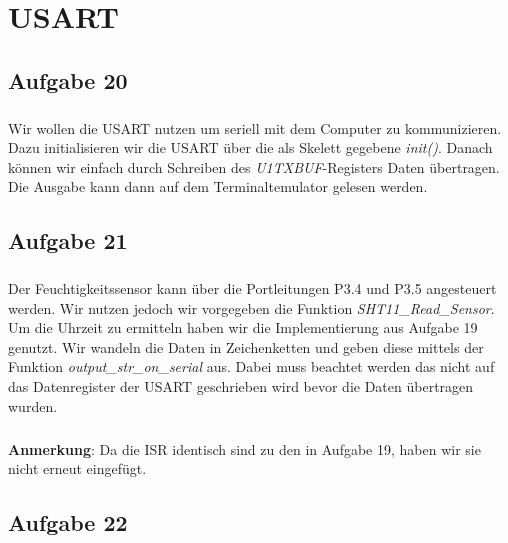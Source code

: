 \chapter{USART}

\section*{Aufgabe 20}

\paragraph*{}
Wir wollen die USART nutzen um seriell mit dem Computer zu kommunizieren. Dazu initialisieren wir die USART über die als Skelett gegebene {\em init()}. Danach können wir einfach durch Schreiben des {\em U1TXBUF}-Registers Daten übertragen. Die Ausgabe kann dann auf dem Terminaltemulator gelesen werden.\\



\section*{Aufgabe 21}

\paragraph*{}
Der Feuchtigkeitssensor kann über die Portleitungen P3.4 und P3.5 angesteuert werden. Wir nutzen jedoch wir vorgegeben die Funktion {\em SHT11\_Read\_Sensor}. Um die Uhrzeit zu ermitteln haben wir die Implementierung aus Aufgabe 19 genutzt. Wir wandeln die Daten in Zeichenketten und geben diese mittels der Funktion {\em output\_str\_on\_serial} aus. Dabei muss beachtet werden das nicht auf das Datenregister der USART geschrieben wird bevor die Daten übertragen wurden.\\



\paragraph*{}
\textbf{Anmerkung}: Da die ISR identisch sind zu den in Aufgabe 19, haben wir sie nicht erneut eingefügt.

\section{Aufgabe 22}

